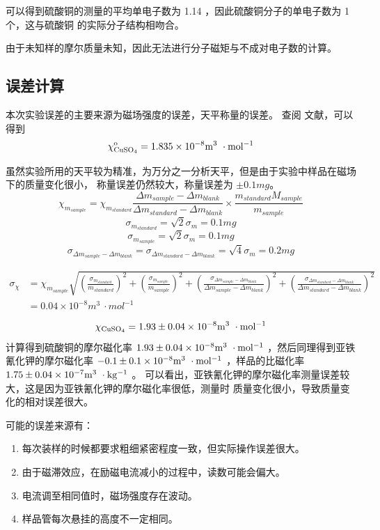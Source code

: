 \documentclass[cn,hazy,pku,12pt,normal,math=newtx,cite=super]{elegantnote}
\begin{document}
可以得到硫酸铜的测量的平均单电子数为 1.14 ，因此硫酸铜分子的单电子数为 1 个，这与硫酸铜
的实际分子结构相吻合。

由于未知样的摩尔质量未知，因此无法进行分子磁矩与不成对电子数的计算。

\subsection[short]{误差计算}

本次实验误差的主要来源为磁场强度的误差，天平称量的误差。
查阅 \cite{CRC}文献，可以得到
$$
\rm \chi_{CuSO_4}^o = 1.835 \times 10^{-8} m^3\ \cdot mol^{-1}
$$

虽然实验所用的天平较为精准，为万分之一分析天平，但是由于实验中样品在磁场下的质量变化很小，
称量误差仍然较大，称量误差为 $\pm 0.1 mg$。
$$
\chi_{m_{sample}} = \chi_{m_{standard}}\frac{\Delta m_{sample} - \Delta m_{blank}}{ \Delta m_{standard} - \Delta m_{blank}}\times \frac{m_{standard} M_{sample}}{m_{sample}} 
$$
$$
\sigma_{m_{standard}} = \sqrt{2} \sigma_{m} =  0.1 mg
$$
$$
\sigma_{m_{sample}} = \sqrt{2} \sigma_{m} = 0.1 mg
$$
$$
\sigma_{\Delta m_{sample} - \Delta m_{blank}}=\sigma_{\Delta m_{standard} - \Delta m_{blank}} =  \sqrt{4} \sigma_{m} = 0.2 mg
$$

\begin{equation*}
    \begin{aligned}
         \sigma_\chi &= \chi_{m_{sample}} \sqrt{(\frac{\sigma_{m_{standard}}}{m_{standard}})^2+(\frac{\sigma_{m_{sample}}}{m_{sample}})^2+(\frac{\sigma_{\Delta m_{sample} - \Delta m_{blank}}}{\Delta m_{sample} - \Delta m_{blank}})^2+(\frac{\sigma_{\Delta m_{standard} - \Delta m_{blank}}}{\Delta m_{standard} - \Delta m_{blank}})^2} \\
                    &= 0.04 \times 10^{-8} m^3\ \cdot mol^{-1}
    \end{aligned}
\end{equation*}

$$
\rm \chi_{CuSO_4} = 1.93 \pm 0.04 \times 10^{-8} m^3\ \cdot mol^{-1}
$$
计算得到硫酸铜的摩尔磁化率 $\rm 1.93 \pm 0.04 \times 10^{-8} m^3\ \cdot mol^{-1}$
 ，然后同理得到亚铁氰化钾的摩尔磁化率 $\rm - 0.1 \pm 0.1 \times 10^{-8} m^3\ \cdot mol^{-1}$
，样品的比磁化率 $\rm 1.75 \pm 0.04 \times 10^{-7} m^3\ \cdot kg^{-1}$ 。
可以看出，亚铁氰化钾的摩尔磁化率测量误差较大，这是因为亚铁氰化钾的摩尔磁化率很低，测量时
质量变化很小，导致质量变化的相对误差很大。

可能的误差来源有：
\begin{enumerate}
    \item 每次装样的时候都要求粗细紧密程度一致，但实际操作误差很大。
    \item 由于磁滞效应，在励磁电流减小的过程中，读数可能会偏大。
    \item 电流调至相同值时，磁场强度存在波动。
    \item 样品管每次悬挂的高度不一定相同。
\end{enumerate}
\end{document}
